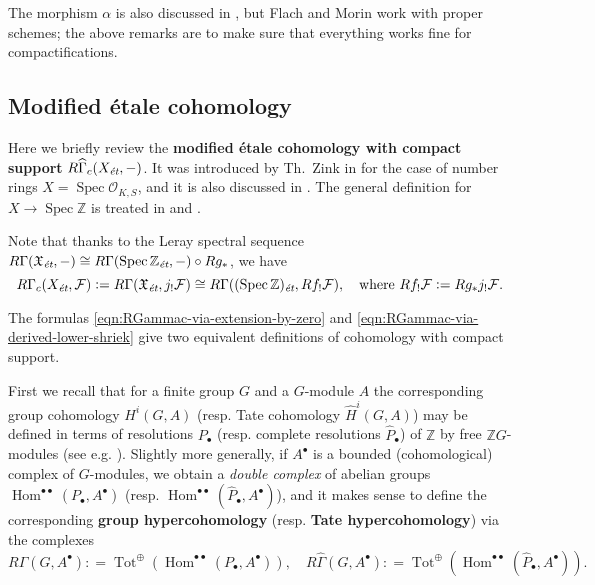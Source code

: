 \documentclass[leqno,12pt]{article}
\theoremstyle{plain}
\theoremstyle{definition}
\DeclareMathOperator{\Spec}{Spec}
\DeclareMathOperator{\Hom}{Hom}
\DeclareMathOperator{\Tot}{Tot}
\newcommand{\ZZ}{\mathbb{Z}}
\newcommand{\dfn}{\mathrel{\mathop:}=}
\newcommand{\et}{\text{\it \'{e}t}}
\begin{document}
The morphism $\alpha$ is also discussed in \cite[Appendix~A]{Flach-Morin-2018},
but Flach and Morin work with proper schemes; the above remarks are to make sure
that everything works fine for compactifications.

\subsection*{Modified \'{e}tale cohomology}

Here we briefly review the
\textbf{modified \'{e}tale cohomology with compact support}
$R\widehat{\Gamma}_c (X_\et, -)$. It was introduced by Th.~Zink in
\cite[Appendix~2]{Haberland-1978} for the case of number rings
$X = \Spec \mathcal{O}_{K,S}$, and it is also discussed in
\cite[\S II.2]{Milne-ADT}. The general definition for $X \to \Spec\ZZ$
is treated in \cite[\S 6.7]{Flach-Morin-2018} and
\cite[\S 2]{Geisser-Schmidt-2018}.

Note that thanks to the Leray spectral sequence
$R\Gamma (\mathfrak{X}_\et, -) \cong R\Gamma (\Spec \ZZ_\et, -)\circ R g_*$,
we have
\begin{equation}
  \label{eqn:RGammac-via-derived-lower-shriek}
  R\Gamma_c (X_\et, \mathcal{F}) \dfn R\Gamma (\mathfrak{X}_\et, j_!\mathcal{F})
  \cong R\Gamma ((\Spec \ZZ)_\et, R f_! \mathcal{F}), \quad
  \text{where } Rf_! \mathcal{F} \dfn R g_* j_! \mathcal{F}.
\end{equation}

The formulas \eqref{eqn:RGammac-via-extension-by-zero} and
\eqref{eqn:RGammac-via-derived-lower-shriek} give two equivalent definitions of
cohomology with compact support.

First we recall that for a finite group $G$ and a $G$-module $A$ the
corresponding group cohomology $H^i (G,A)$ (resp. Tate cohomology
$\widehat{H}^i (G,A)$) may be defined in terms of resolutions $P_\bullet$
(resp. complete resolutions $\widehat{P}_\bullet$) of $\ZZ$ by free
$\ZZ G$-modules (see e.g. \cite[Chapter~VI]{Brown-1994}). Slightly more
generally, if $A^\bullet$ is a bounded (cohomological) complex of
$G$-modules, we obtain a \emph{double complex} of abelian groups
$\Hom^{\bullet\bullet} (P_\bullet, A^\bullet)$ (resp.  $\Hom^{\bullet\bullet}
(\widehat{P}_\bullet, A^\bullet)$), and it makes sense to define the
corresponding \textbf{group hypercohomology}
(resp. \textbf{Tate hypercohomology}) via the complexes
\[ R\Gamma (G, A^\bullet) \dfn
\Tot^\oplus (\Hom^{\bullet\bullet} (P_\bullet, A^\bullet)), \quad
R\widehat{\Gamma} (G, A^\bullet) \dfn
\Tot^\oplus (\Hom^{\bullet\bullet} (\widehat{P}_\bullet, A^\bullet)). \]
\end{document}
